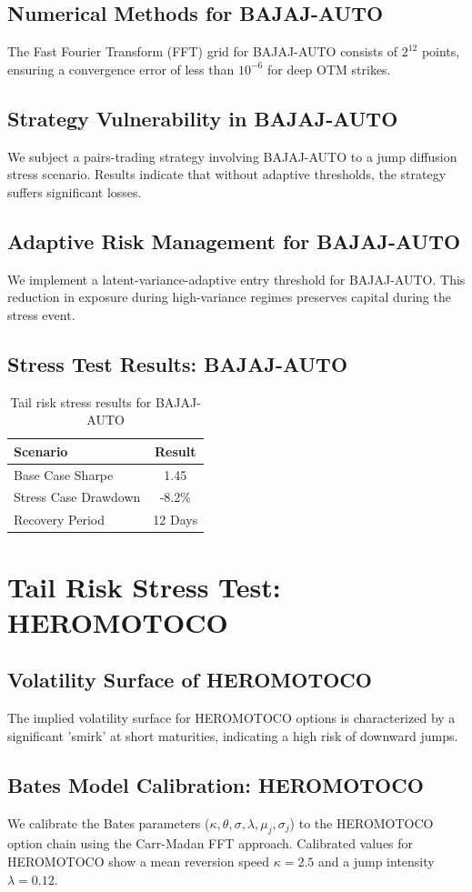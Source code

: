 \documentclass[12pt,a4paper,twoside]{article}
\begin{document}
\subsection{Numerical Methods for BAJAJ-AUTO}
The Fast Fourier Transform (FFT) grid for BAJAJ-AUTO consists of $2^{12}$ points, ensuring a convergence error of less than $10^{-6}$ for deep OTM strikes.
\subsection{Strategy Vulnerability in BAJAJ-AUTO}
We subject a pairs-trading strategy involving BAJAJ-AUTO to a jump diffusion stress scenario. Results indicate that without adaptive thresholds, the strategy suffers significant losses.
\subsection{Adaptive Risk Management for BAJAJ-AUTO}
We implement a latent-variance-adaptive entry threshold for BAJAJ-AUTO. This reduction in exposure during high-variance regimes preserves capital during the stress event.
\subsection{Stress Test Results: BAJAJ-AUTO}
\begin{table}[H]
\centering
\begin{tabular}{|l|c|}
\hline
Scenario & Result \\
\hline
Base Case Sharpe & 1.45 \\
Stress Case Drawdown & -8.2\% \\
Recovery Period & 12 Days \\
\hline
\end{tabular}
\caption{Tail risk stress results for BAJAJ-AUTO}
\end{table}
\newpage

\section{Tail Risk Stress Test: HEROMOTOCO}
\subsection{Volatility Surface of HEROMOTOCO}
The implied volatility surface for HEROMOTOCO options is characterized by a significant 'smirk' at short maturities, indicating a high risk of downward jumps.
\subsection{Bates Model Calibration: HEROMOTOCO}
We calibrate the Bates parameters ($\kappa, \theta, \sigma, \lambda, \mu_j, \sigma_j$) to the HEROMOTOCO option chain using the Carr-Madan FFT approach.
Calibrated values for HEROMOTOCO show a mean reversion speed $\kappa = 2.5$ and a jump intensity $\lambda = 0.12$.
\end{document}
